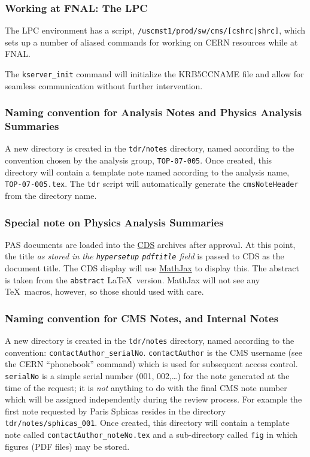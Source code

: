 \subsubsection{Working at FNAL: The LPC}
The LPC environment has a script, \texttt{/uscmst1/prod/sw/cms/[cshrc|shrc]}, which sets up a number of aliased commands for working on CERN resources while at FNAL.

The \texttt{kserver\_init} command will initialize the KRB5CCNAME file and allow for seamless communication without further intervention.
\subsubsection{Naming convention for Analysis Notes and Physics Analysis Summaries}

A new directory is created in the \texttt{tdr/notes} directory, named according
to the convention chosen by the analysis group, \eg \texttt{TOP-07-005}.
Once created, this directory will contain a template note named according to
the analysis name, \eg \texttt{TOP-07-005.tex}. The \texttt{tdr} script will automatically
generate the \texttt{cmsNoteHeader} from the directory name.

\subsubsection{Special note on Physics Analysis Summaries}
PAS documents are loaded into the \href{http://cdsweb.cern.ch/collection/CMS\%20PHYSICS\%20ANALYSIS\%20SUMMARIES}{CDS} archives after approval. At this point, the title \emph{as stored in the \texttt{hypersetup} \texttt{pdftitle}
field} is passed to CDS as the document title. The CDS display will use \href{https://www.mathjax.org/}{MathJax} to display this.  The abstract is taken from the \texttt{abstract} \LaTeX\ version. MathJax will not see any \TeX\ macros, however, so those should used with care.

\subsubsection{Naming convention for CMS Notes, and Internal Notes}

A new directory is created in the \texttt{tdr/notes} directory, named according to
the convention: \texttt{contactAuthor\_serialNo}.
\texttt{contactAuthor} is the CMS username (see the CERN ``phonebook'' command)
which is used for subsequent access control.
\texttt{serialNo} is a simple serial number (001, 002,\ldots) for the note
generated at the time of the request; it is \emph{not} anything to do with the
final CMS note number which will be assigned independently during the review process.
For example the first note requested by Paris Sphicas resides in
the directory \texttt{tdr/notes/sphicas\_001}.
Once created, this directory will contain a template note
called \texttt{contactAuthor\_noteNo.tex} and a sub-directory
called \texttt{fig} in which figures (PDF files) may be stored.

